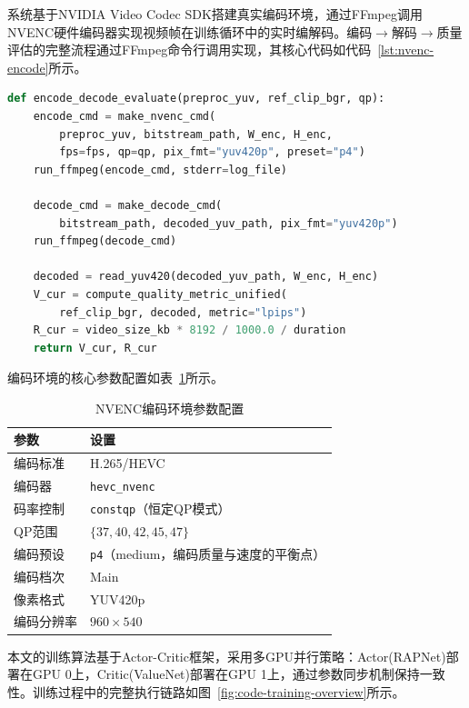 系统基于NVIDIA Video Codec SDK搭建真实编码环境，通过FFmpeg调用NVENC硬件编码器实现视频帧在训练循环中的实时编解码。编码$\to$解码$\to$质量评估的完整流程通过FFmpeg命令行调用实现，其核心代码如代码~\ref{lst:nvenc-encode}所示。

\begin{lstlisting}[language=Python, caption={NVENC Encode-Decode-Evaluate Pipeline}, label={lst:nvenc-encode}, basicstyle=\ttfamily\footnotesize, aboveskip=4pt, belowskip=4pt]
def encode_decode_evaluate(preproc_yuv, ref_clip_bgr, qp):
    encode_cmd = make_nvenc_cmd(
        preproc_yuv, bitstream_path, W_enc, H_enc,
        fps=fps, qp=qp, pix_fmt="yuv420p", preset="p4")
    run_ffmpeg(encode_cmd, stderr=log_file)

    decode_cmd = make_decode_cmd(
        bitstream_path, decoded_yuv_path, pix_fmt="yuv420p")
    run_ffmpeg(decode_cmd)

    decoded = read_yuv420(decoded_yuv_path, W_enc, H_enc)
    V_cur = compute_quality_metric_unified(
        ref_clip_bgr, decoded, metric="lpips")
    R_cur = video_size_kb * 8192 / 1000.0 / duration
    return V_cur, R_cur
\end{lstlisting}

编码环境的核心参数配置如表~\ref{tab:nvenc-config}所示。

\begin{table}[htbp]
  \centering
  \caption{NVENC编码环境参数配置}
  \label{tab:nvenc-config}
  \begin{tabular}{ll}
    \toprule
    \textbf{参数} & \textbf{设置} \\
    \midrule
    编码标准     & H.265/HEVC \\
    编码器       & \texttt{hevc\_nvenc} \\
    码率控制     & \texttt{constqp}（恒定QP模式） \\
    QP范围       & $\{37, 40, 42, 45, 47\}$ \\
    编码预设     & \texttt{p4}（medium，编码质量与速度的平衡点） \\
    编码档次     & Main \\
    像素格式     & YUV420p \\
    编码分辨率   & $960 \times 540$ \\
    \bottomrule
  \end{tabular}
\end{table}

本文的训练算法基于Actor-Critic框架，采用多GPU并行策略：Actor(RAPNet)部署在GPU 0上，Critic(ValueNet)部署在GPU 1上，通过参数同步机制保持一致性。训练过程中的完整执行链路如图~\ref{fig:code-training-overview}所示。


